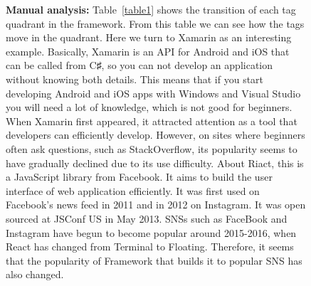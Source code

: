 \documentclass[conference]{IEEEtran}
\begin{document}
\begin{figure}[t]
\begin{oframed}
\textbf{Manual analysis:}
Table~\ref{table1} shows the transition of each tag quadrant in the framework. From this table we can see how the tags move in the quadrant. Here we turn to Xamarin as an interesting example. Basically, Xamarin is an API for Android and iOS that can be called from C♯, so you can not develop an application without knowing both details. This means that if you start developing Android and iOS apps with Windows and Visual Studio you will need a lot of knowledge, which is not good for beginners. When Xamarin first appeared, it attracted attention as a tool that developers can efficiently develop. However, on sites where beginners often ask questions, such as StackOverflow, its popularity seems to have gradually declined due to its use difficulty.
About Riact, this is a JavaScript library from Facebook. It aims to build the user interface of web application efficiently. It was first used on Facebook's news feed in 2011 and in 2012 on Instagram. It was open sourced at JSConf US in May 2013. SNSs such as FaceBook and Instagram have begun to become popular around 2015-2016, when React has changed from Terminal to Floating. Therefore, it seems that the popularity of Framework that builds it to popular SNS has also changed.

\smallskip\smallskip


\end{oframed}
\end{figure}
\end{document}
